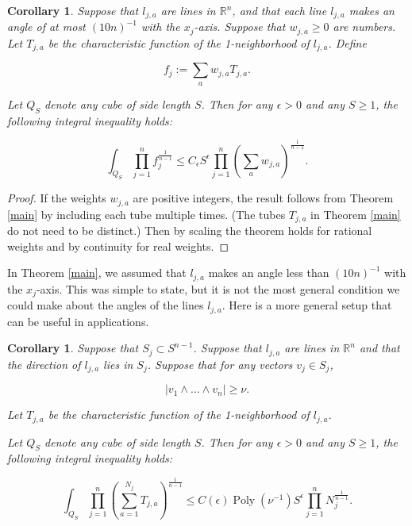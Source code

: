 \documentclass{amsart}
\newtheorem{cor}[prop]{Corollary}
\DeclareMathOperator{\Poly}{Poly}
\newcommand{\eps}{\epsilon}
\newcommand{\RR}{\mathbb{R}}
\begin{document}
\begin{cor} \label{weight} Suppose that $l_{j,a}$ are lines in $\RR^n$, and that each line $l_{j,a}$ makes an angle of at most $(10 n)^{-1}$ with the $x_j$-axis.  Suppose that $w_{j,a} \ge 0$ are numbers.  Let $T_{j,a}$ be the characteristic function of the 1-neighborhood of $l_{j,a}$.  Define

$$ f_j := \sum_{a} w_{j,a} T_{j,a}. $$

Let $Q_S$ denote any cube of side length $S$.  Then for any $\eps > 0$ and any $S \ge 1$, the following integral inequality holds:

\begin{equation} \label{multkakweight}  \int_{Q_S} \prod_{j=1}^n f_j^{\frac{1}{n-1}}  \le C_\eps S^\eps \prod_{j=1}^n \left( \sum_a w_{j,a} \right)^{\frac{1}{n-1}}. \end{equation}
\end{cor}

\begin{proof} If the weights $w_{j,a}$ are positive integers, the result follows from Theorem \ref{main} by including each tube multiple times.  (The tubes $T_{j,a}$ in Theorem \ref{main} do not need to be distinct.)  Then by scaling the theorem holds for rational weights and by continuity for real weights.
\end{proof}

In Theorem \ref{main}, we assumed that $l_{j,a}$ makes an angle less than $(10n)^{-1}$ with the $x_j$-axis.  This was simple to state, but it is not the most general condition we could make about the angles of the lines $l_{j,a}$.  Here is a more general setup that can be useful in applications.

\begin{cor}
Suppose that $S_j \subset S^{n-1}$.  Suppose that $l_{j,a}$ are lines in $\RR^n$ and that the direction of $l_{j,a}$ lies in $S_j$.  Suppose that for any vectors $v_j \in S_j$,

$$ | v_1 \wedge ... \wedge v_n | \ge \nu.$$

\noindent Let $T_{j,a}$ be the characteristic function of the 1-neighborhood of $l_{j,a}$.

Let $Q_S$ denote any cube of side length $S$.  Then for any $\eps > 0$ and any $S \ge 1$, the following integral inequality holds:

\begin{equation}  \int_{Q_S} \prod_{j=1}^n \left( \sum_{a = 1}^{N_j} T_{j,a} \right)^{\frac{1}{n-1}}  \le C(\eps) \Poly(\nu^{-1}) S^\eps \prod_{j=1}^n N_j^{\frac{1}{n-1}}. \end{equation}

\end{cor}
\end{document}
